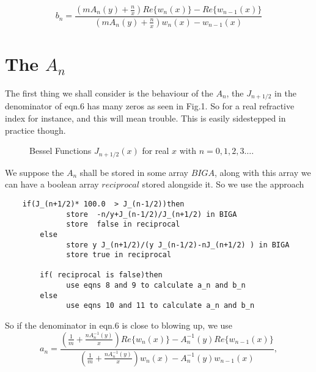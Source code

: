 \begin{equation}
b_n=\frac{ \left ( 
m A_n(y)+\frac{n}{x}
 \right )
Re \lbrace w_n(x) \rbrace -Re \lbrace w_{n-1}(x) \rbrace
}
{ \left ( 
m A_n(y)+\frac{n}{x} 
\right )
 w_n(x) - w_{n-1}(x) }
\end{equation}

\section{The $A_n$}

The first thing we shall consider is the behaviour of the $A_n$, the 
$J_{n+1/2}$ in the denominator of eqn.6 has many zeros as seen in Fig.1.
So  for a real refractive index for instance, and this will mean trouble. 
This is easily sidestepped in practice though.

\vspace*{10cm}
\begin{figure}[htb]
\caption{ Bessel Functions $J_{n+1/2}(x)$ for real $x$ with $ n=0,1,2,3 \ldots$.}
\end{figure}

We suppose the $A_n$ shall be stored in some array $BIGA$, along with this array we can have a boolean array  $reciprocal$ stored alongside it. So we use the approach

\begin{verbatim}
	if(J_(n+1/2)* 100.0  > J_(n-1/2))then
              store  -n/y+J_(n-1/2)/J_(n+1/2) in BIGA
              store  false in reciprocal
        else
              store y J_(n+1/2)/(y J_(n-1/2)-nJ_(n+1/2) ) in BIGA
              store true in reciprocal

        if( reciprocal is false)then
              use eqns 8 and 9 to calculate a_n and b_n
        else
              use eqns 10 and 11 to calculate a_n and b_n
\end{verbatim}

So if the denominator in eqn.6 is close to blowing up, we use
\begin{equation}
a_n=\frac{ \left ( 
\frac{1}{m}+\frac{n A^{-1}_n(y)}{x}
 \right )
Re \lbrace w_n(x) \rbrace - A^{-1}_n(y)Re \lbrace w_{n-1}(x) \rbrace
}
{ \left ( 
\frac{1}{m}+\frac{n A^{-1}_n(y)}{x} 
\right )
 w_n(x) - A^{-1}_n(y) w_{n-1}(x) },
\end{equation}

